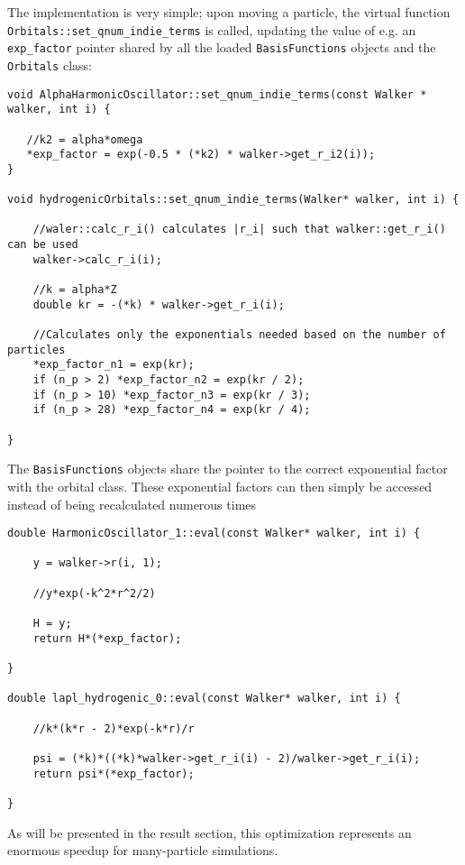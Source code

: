 The implementation is very simple; upon moving a particle, the virtual function \\\verb+Orbitals::set_qnum_indie_terms+ is called, updating the value of e.g. an \verb+exp_factor+ pointer shared by all the loaded \verb+BasisFunctions+ objects and the \verb+Orbitals+ class:


\vspace{0.5cm}
\begin{lstlisting}
void AlphaHarmonicOscillator::set_qnum_indie_terms(const Walker * walker, int i) {
   
   //k2 = alpha*omega 
   *exp_factor = exp(-0.5 * (*k2) * walker->get_r_i2(i));
}

void hydrogenicOrbitals::set_qnum_indie_terms(Walker* walker, int i) {

    //waler::calc_r_i() calculates |r_i| such that walker::get_r_i() can be used
    walker->calc_r_i(i);

    //k = alpha*Z 
    double kr = -(*k) * walker->get_r_i(i);
    
    //Calculates only the exponentials needed based on the number of particles
    *exp_factor_n1 = exp(kr);
    if (n_p > 2) *exp_factor_n2 = exp(kr / 2);
    if (n_p > 10) *exp_factor_n3 = exp(kr / 3);
    if (n_p > 28) *exp_factor_n4 = exp(kr / 4);

}
\end{lstlisting}

The \verb+BasisFunctions+ objects share the pointer to the correct exponential factor with the orbital class. These exponential factors can then simply be accessed instead of being recalculated numerous times

\clearpage
\begin{lstlisting}
double HarmonicOscillator_1::eval(const Walker* walker, int i) {

    y = walker->r(i, 1);
    
    //y*exp(-k^2*r^2/2)
    
    H = y;
    return H*(*exp_factor);
    
}

double lapl_hydrogenic_0::eval(const Walker* walker, int i) {
    
    //k*(k*r - 2)*exp(-k*r)/r
    
    psi = (*k)*((*k)*walker->get_r_i(i) - 2)/walker->get_r_i(i);
    return psi*(*exp_factor);
    
}
\end{lstlisting}

As will be presented in the result section, this optimization represents an enormous speedup for many-particle simulations.

